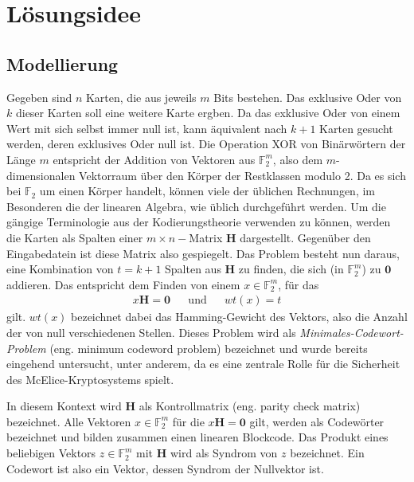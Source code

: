 \documentclass[a4paper,10pt,ngerman]{scrartcl}
\begin{document}
\maketitle
\tableofcontents

\section{Lösungsidee}
\subsection{Modellierung}
Gegeben sind $n$ Karten, die aus jeweils $m$ Bits bestehen. Das exklusive Oder von $k$ dieser Karten soll eine weitere Karte ergben.
Da das exklusive Oder von einem Wert mit sich selbst immer null ist, kann äquivalent nach $k + 1$ Karten gesucht werden, deren exklusives Oder null ist.
Die Operation XOR von Binärwörtern der Länge $m$ entspricht der Addition von Vektoren aus $\mathbb{F}_2^m$, also dem $m$-dimensionalen Vektorraum über den Körper der Restklassen modulo 2. 
Da es sich bei $\mathbb{F}_2$ um einen Körper handelt, können viele der üblichen Rechnungen, im Besonderen die der linearen Algebra, wie üblich durchgeführt werden. 
Um die gängige Terminologie aus der Kodierungstheorie verwenden zu können, werden die Karten als Spalten einer $m\times n-$Matrix $\mathbf{H}$ dargestellt. Gegenüber den Eingabedatein ist diese Matrix also gespiegelt. 
Das Problem besteht nun daraus, eine Kombination von $t = k + 1$ Spalten aus $\mathbf{H}$ zu finden, die sich (in $\mathbb{F}_2^m$) zu $\mathbf{0}$ addieren. Das entspricht dem Finden von einem $x \in \mathbb{F}^m_2$, für das 
\begin{align*}
    x \mathbf{H} = \mathbf{0} && \text{und} && wt(x) = t
\end{align*}
gilt. $wt(x)$ bezeichnet dabei das Hamming-Gewicht des Vektors, also die Anzahl der von null verschiedenen Stellen. 
Dieses Problem wird als \textit{Minimales-Codewort-Problem} (eng. minimum codeword problem) bezeichnet und wurde bereits eingehend untersucht, unter anderem, da es eine zentrale Rolle für die Sicherheit des McElice-Kryptosystems spielt. 

In diesem Kontext wird $\mathbf{H}$ als Kontrollmatrix (eng. parity check matrix) bezeichnet.
Alle Vektoren $x \in \mathbb{F}^m_2$ für die $x \mathbf{H} = \mathbf{0}$ gilt,  werden als Codewörter bezeichnet und bilden zusammen einen linearen Blockcode. Das Produkt eines beliebigen Vektors $z \in \mathbb{F}^m_2$ mit $\mathbf{H}$ wird als Syndrom von $z$ bezeichnet. Ein Codewort ist also ein Vektor, dessen Syndrom der Nullvektor ist. 
\end{document}
